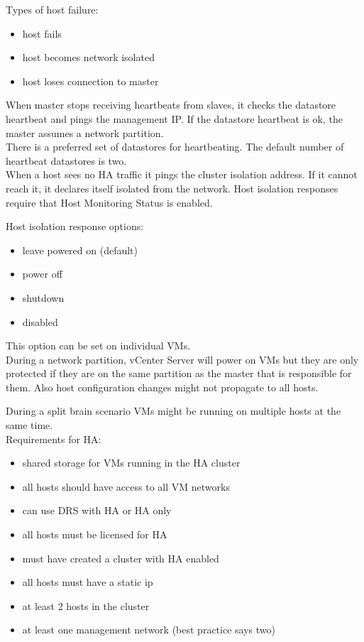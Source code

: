 Types of host failure:

\begin{itemize}
\item host fails
\item host becomes network isolated
\item host loses connection to master
\end{itemize}

When master stops receiving heartbeats from slaves, it checks the datastore
heartbeat and pings the management IP. If the datastore heartbeat is ok, the
master assumes a network partition.\\

There is a preferred set of datastores for heartbeating. The default number
of heartbeat datastores is two.\\

When a host sees no HA traffic it pings the cluster isolation address. If it
cannot reach it, it declares itself isolated from the network. Host isolation
responses require that Host Monitoring Status is enabled.

Host isolation response options:

\begin{itemize}
\item leave powered on (default)
\item power off
\item shutdown
\item disabled
\end{itemize}

This option can be set on individual VMs.\\

During a network partition, vCenter Server will power on VMs but they are
only protected if they are on the same partition as the master that is
responsible for them. Also host configuration changes might not propagate to
all hosts.

During a split brain scenario VMs might be running on multiple hosts at the
same time.\\

Requirements for HA:

\begin{itemize}
\item shared storage for VMs running in the HA cluster
\item all hosts should have access to all VM networks
\item can use DRS with HA or HA only
\item all hosts must be licensed for HA
\item must have created a cluster with HA enabled
\item all hosts must have a static ip
\item at least 2 hosts in the cluster
\item at least one management network (best practice says two)
\end{itemize}

